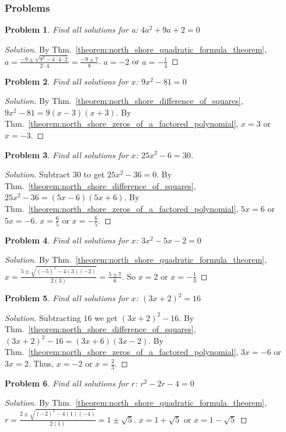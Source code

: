 \documentclass{article}
\theoremstyle{mystyle}
\newtheorem{problem}{Problem}[section]
\begin{document}
\subsubsection{Problems}
\begin{problem}
Find all solutions for a: $4a^2 + 9a + 2 = 0$
\end{problem}
\begin{proof}[Solution]
By Thm.~\ref{theorem:north_shore_quadratic_formula_theorem}, $a = \frac{-9 \pm \sqrt{9^2 - 4\cdot 4 \cdot 2}}{2\cdot 4} = \frac{-9 \pm 7}{8}$. $a=-2$ or $a=-\frac{1}{4}$
\end{proof}
\begin{problem}
Find all solutions for $x$: $9x^2 - 81 = 0$
\end{problem}
\begin{proof}[Solution]
By Thm.~\ref{theorem:north_shore_difference_of_squares}, $9x^2-81 = 9(x - 3)(x+3)$. By Thm.~\ref{theorem:north_shore_zeros_of_a_factored_polynomial}, $x = 3$ or $x= -3$.
\end{proof}
\begin{problem}
Find all solutions for $x$: $25x^2 - 6 = 30$.
\end{problem}
\begin{proof}[Solution]
Subtract $30$ to get $25x^2 - 36 = 0$. By Thm.~\ref{theorem:north_shore_difference_of_squares}, $25x^2-36 =(5x - 6)(5x+6)$. By Thm.~\ref{theorem:north_shore_zeros_of_a_factored_polynomial}, $5x = 6$ or $5x = -6$. $x = \frac{6}{5}$ or $x=-\frac{6}{5}$.
\end{proof}
\begin{problem}
Find all solutions for $x$: $3x^2 - 5x - 2 = 0$
\end{problem}
\begin{proof}[Solution]
By Thm.~\ref{theorem:north_shore_quadratic_formula_theorem}, $x = \frac{5 \pm \sqrt{(-5)^2 - 4(3)(-2)}}{2(3)} = \frac{5 \pm 7}{6}$. So $x = 2$ or $x = -\frac{1}{3}$
\end{proof}
\begin{problem}
Find all solutions for $x$: $(3x+2)^2 = 16$
\end{problem}
\begin{proof}[Solution]
Subtracting $16$ we get $(3x+2)^2 - 16$. By Thm.~\ref{theorem:north_shore_difference_of_squares}, $(3x+2)^2-16 = (3x+6)(3x-2)$. By Thm.~\ref{theorem:north_shore_zeros_of_a_factored_polynomial}, $3x = -6$ or $3x = 2$. Thus, $x = -2$ or $x = \frac{2}{3}$.
\end{proof}
\begin{problem}
Find all solutions for $r$: $r^2 - 2r - 4 = 0$
\end{problem}
\begin{proof}[Solution]
By Thm.~\ref{theorem:north_shore_quadratic_formula_theorem}, $r = \frac{2 \pm \sqrt{(-2)^2 - 4(1)(-4)}}{2(1)} =  1\pm \sqrt{5}$. $x = 1+\sqrt{5}$ or $x=1-\sqrt{5}$
\end{proof}
\end{document}
